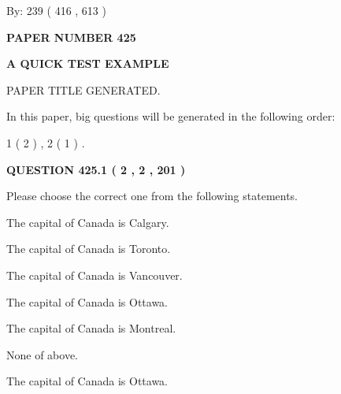 \documentclass[12pt]{article}
\begin{document}
   
\hspace{1.0in} By: 
 239 ( 416 ,  613 )
   
   
   
   
\newpage 
\setcounter{page}{ 
   425001 } 
   
   
   
   
 {\textbf{ \Large{ PAPER NUMBER  425  }}}
   
   
\vspace{0.2in}
   
   
   
   
   
   
   
   
 \vspace{0.2in}
{\LARGE {\textbf{ A QUICK TEST EXAMPLE}}}
   
   
 PAPER TITLE GENERATED.
   
   
   
\vspace{0.2in}
   
In this paper, big questions will be generated in the following order: 
   
   
   1 ( 2 )
 ,
   2 ( 1 )
 .
  
\vspace{0.2in}
  
{\textbf{\Large{QUESTION
425.1 
 ( 2 , 2 , 201 )
}}}
  
  
Please choose the correct one from the following statements.
 
 
The capital of Canada is Calgary.
 
 
The capital of Canada is Toronto.
 
 
The capital of Canada is Vancouver.
 
 
The capital of Canada is Ottawa.
 
 
The capital of Canada is Montreal.
 
 
 None of above.
 
 
\noindent{}
 
 
The capital of Canada is Ottawa.
 
 
\noindent{}
 
\end{document}
